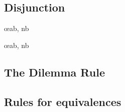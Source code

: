 \subsection*{Disjunction}
\begin{multicols}{2}
\begin{fitchproof}
\end{fitchproof}
\begin{fitchproof}
\end{fitchproof}
\end{multicols}
\begin{multicols}{2}
\begin{fitchproof}
	\oe{ab, nb}
\end{fitchproof}
\begin{fitchproof}
	\oe{ab, nb}
\end{fitchproof}
\end{multicols}

\begin{multicols}{2}
\subsection*{The Dilemma Rule}

\begin{fitchproof}
	 
\end{fitchproof}

\end{multicols}

\subsection*{Rules for equivalences}

